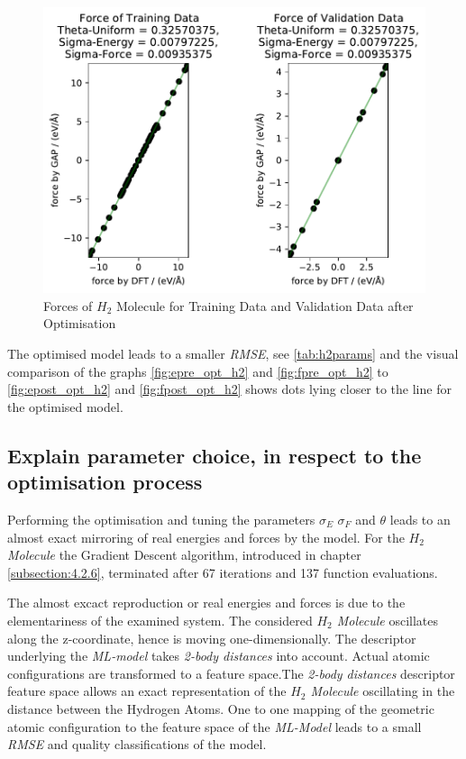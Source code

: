 \begin{figure}
	\includegraphics{../Bilder/Opt_Forces_H2.pdf}
	\caption{Forces  of $H_2$ Molecule for Training Data and Validation Data after Optimisation}
	\label{fpost_opt_h2}
\end{figure}



The optimised model leads to a smaller \textit{RMSE}, see \ref{tab:h2params} and the visual comparison of the graphs \ref{fig:epre_opt_h2} and \ref{fig:fpre_opt_h2}  to \ref{fig:epost_opt_h2}  and \ref{fig:fpost_opt_h2}  shows dots lying closer to the line for the optimised model. 


\subsection{Explain parameter choice, in respect to the optimisation process}
\label{subsection:5.1.2}

Performing the optimisation and tuning the parameters $\sigma_E$ $\sigma_F$ and $\theta$ leads to an almost exact mirroring of real energies and forces by the model. For the  \textit{$H_2$ Molecule} the Gradient Descent algorithm, introduced in chapter \ref{subsection:4.2.6}, terminated after 67 iterations and 137 function evaluations. 


The almost excact reproduction or real energies and forces is due to the elementariness of the examined system. The considered  \textit{$H_2$ Molecule} oscillates along the z-coordinate, hence is moving one-dimensionally. The descriptor underlying the \textit{ML-model} takes \textit{2-body distances} into account. Actual atomic configurations are transformed to a feature space.The \textit{2-body distances} descriptor feature space allows an exact representation of the  \textit{$H_2$ Molecule} oscillating in the distance between the Hydrogen Atoms. One to one mapping of the geometric atomic configuration to the feature space of the \textit{ML-Model} leads to a small \textit{RMSE} and quality classifications of the model. 





